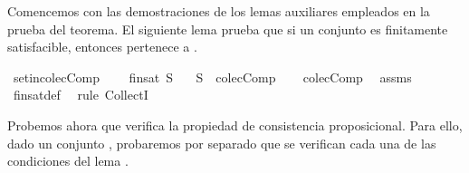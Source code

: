 \begin{isabellebody}
\begin{isamarkuptext}
  Comencemos con las demostraciones de los lemas auxiliares empleados en la prueba del teorema.
  El siguiente lema prueba que si un conjunto es finitamente satisfacible, entonces pertenece a .%
\end{isamarkuptext}\isamarkuptrue%
\isamarkupfalse%
\ set{\isacharunderscore}in{\isacharunderscore}colecComp{\isacharcolon}\ \isanewline
\ \ \ {\isachardoublequoteopen}fin{\isacharunderscore}sat\ S{\isachardoublequoteclose}\isanewline
\ \ \ {\isachardoublequoteopen}S\ {\isasymin}\ colecComp{\isachardoublequoteclose}\isanewline
%
\isadelimproof
\ \ %
\endisadelimproof
%
\isatagproof
{}\isamarkupfalse%
\ colecComp\ \isamarkupfalse%
\ assms\ \isamarkupfalse%
\ fin{\isacharunderscore}sat{\isacharunderscore}def\ \isamarkupfalse%
\ {\isacharparenleft}rule\ CollectI{\isacharparenright}%
\endisatagproof
{\isafoldproof}%
%
\isadelimproof
%
\endisadelimproof
%
\begin{isamarkuptext}%
Probemos ahora que  verifica la propiedad de consistencia proposicional. Para ello, dado un 
  conjunto , probaremos por separado que se verifican cada una de las condiciones del 
  lema .
  

\end{isamarkuptext}
\end{isabellebody}
